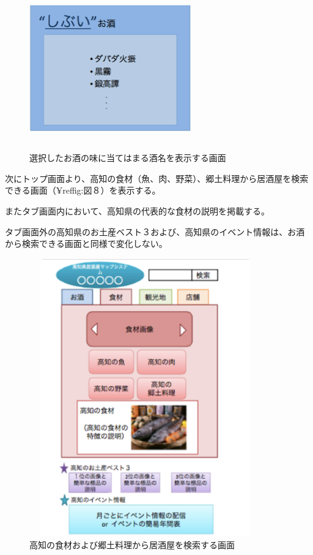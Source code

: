 \documentclass[a4j,titlepage]{jarticle}
\begin{document}
\begin {figure}[!htbp]
    \begin{center}
    \includegraphics [height=7cm, width=7cm]{7.eps}
    \caption {選択したお酒の味に当てはまる酒名を表示する画面}
    \label {fig:7}
    \end{center}
\end {figure}



次にトップ画面より、高知の食材（魚、肉、野菜）、郷土料理から居酒屋を検索できる画面（¥ref{fig:図８}）を表示する。



またタブ画面内において、高知県の代表的な食材の説明を掲載する。



タブ画面外の高知県のお土産ベスト３および、高知県のイベント情報は、お酒から検索できる画面と同様で変化しない。
\clearpage
\begin {figure}[!htbp]
    \begin{center}
    \includegraphics [height=12cm, width=10cm]{8.eps}
    \caption {高知の食材および郷土料理から居酒屋を検索する画面}
    \label {fig:8}
    \end{center}
\end {figure}
\end{document}
